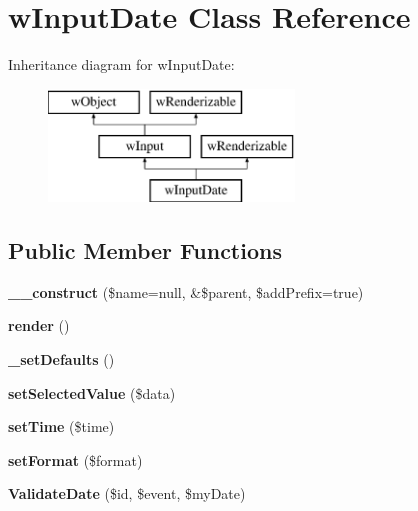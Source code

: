 \hypertarget{classwInputDate}{
\section{wInputDate Class Reference}
\label{classwInputDate}
}
Inheritance diagram for wInputDate:\begin{figure}[H]
\begin{center}
\leavevmode
\includegraphics[height=3.000000cm]{classwInputDate}
\end{center}
\end{figure}
\subsection*{Public Member Functions}
\begin{DoxyCompactItemize}
\item 
\hypertarget{classwInputDate_a24005325e5e730cdc3dff26afca8b051}{
{\bfseries \_\-\_\-construct} (\$name=null, \&\$parent, \$addPrefix=true)}
\label{classwInputDate_a24005325e5e730cdc3dff26afca8b051}

\item 
\hypertarget{classwInputDate_ad4a450095e7a28b7cd4c69d693f48dd2}{
{\bfseries render} ()}
\label{classwInputDate_ad4a450095e7a28b7cd4c69d693f48dd2}

\item 
\hypertarget{classwInputDate_a8922d1e6d2cde24dc4dc05794ea1859b}{
{\bfseries \_\-setDefaults} ()}
\label{classwInputDate_a8922d1e6d2cde24dc4dc05794ea1859b}

\item 
\hypertarget{classwInputDate_a9f4597068fdf24ceb8066650cd523714}{
{\bfseries setSelectedValue} (\$data)}
\label{classwInputDate_a9f4597068fdf24ceb8066650cd523714}

\item 
\hypertarget{classwInputDate_a8043b0faea2c624b24ed70cd3d5284b7}{
{\bfseries setTime} (\$time)}
\label{classwInputDate_a8043b0faea2c624b24ed70cd3d5284b7}

\item 
\hypertarget{classwInputDate_af575a0b962a5bd51b95fc9b1369c5daf}{
{\bfseries setFormat} (\$format)}
\label{classwInputDate_af575a0b962a5bd51b95fc9b1369c5daf}

\item 
\hypertarget{classwInputDate_ad346e9139577282de0340f7d249c2fc6}{
{\bfseries ValidateDate} (\$id, \$event, \$myDate)}
\label{classwInputDate_ad346e9139577282de0340f7d249c2fc6}

\end{DoxyCompactItemize}

